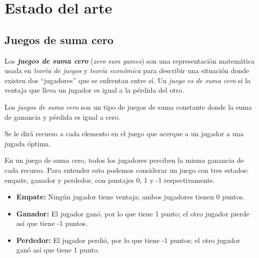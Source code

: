 \documentclass[submission]{eptcs}
\begin{document}
  \maketitle


  \section{Estado del arte}
    \subsection{Juegos de suma cero}
      Los \textit{\textbf{juegos de suma cero}}\cite{wiki-zero-sum-game} (\textit{zero sum games}) 
      son una representación matemática usada en \textit{teoría de juegos} y \textit{teoría 
      económica} para describir una situación donde existen dos \enquote{jugadores} que se enfrentan
      entre sí.
      Un \textit{juego es de suma cero} si la ventaja que lleva un jugador es igual a la pérdida del
      otro.

      Los \textit{juegos de suma cero} son un tipo de juegos de suma constante donde la suma de 
      ganancia y pérdida es igual a cero.

      \begin{definition}
        Se le dirá recurso a cada elemento en el juego que acerque a un jugador a una jugada óptima.
      \end{definition}

      En un juego de suma cero, todos los jugadores perciben la misma ganancia de cada recurso.   
      Para entender esto podemos considerar un juego con tres estados: empate, ganador y perdedor, 
      con puntajes 0, 1 y -1 respectivamente.

      \begin{itemize}
        \item \textbf{Empate:} Ningún jugador tiene ventaja; ambos jugadores tienen 0 puntos.
        \item \textbf{Ganador:} El jugador ganó, por lo que tiene 1 punto; el otro jugador pierde 
          así que tiene -1 puntos.
        \item \textbf{Perdedor:} El jugador perdió, por lo que tiene -1 puntos; el otro jugador ganó 
          así que tiene 1 punto.
      \end{itemize}
      
\end{document}
